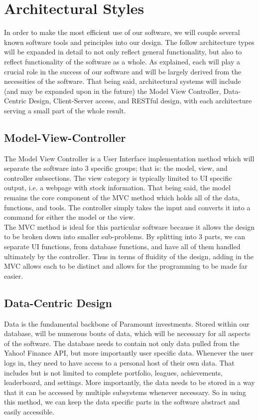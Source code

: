 \section{Architectural Styles}

In order to make the most efficient use of our software, we
will couple several known software tools and principles into
our design. The follow architecture types will be expanded in
detail to not only reflect general functionality, but also to
reflect functionality of the software as a whole. As explained,
each will play a crucial role in the success of our software and
will be largely derived from the necessities of the software.
That being said, architectural systems will include (and may be
expanded upon in the future) the Model View Controller,
Data-Centric Design, Client-Server access, and RESTful design,
with each architecture serving a small part of the whole result.

\subsection{Model-View-Controller}

The Model View Controller is a User Interface implementation method
which will separate the software into 3 specific groups; that is:
the model, view, and controller subsections. The view category is
typically limited to UI specific output, i.e. a webpage with stock
information. That being said, the model remains the core component
of the MVC method which holds all of the data, functions, and tools.
The controller simply takes the input and converts it into a command
for either the model or the view.\\

The MVC method is ideal for this particular software because it allows
the design to be broken down into smaller sub-problems. By splitting
into 3 parts, we can separate UI functions, from database functions,
and have all of them handled ultimately by the controller. Thus in
terms of fluidity of the design, adding in the MVC allows each to be
distinct and allows for the programming to be made far easier.

\subsection{Data-Centric Design}

Data is the fundamental backbone of Paramount investments.
Stored within our database, will be numerous bouts of data,
which will be necessary for all aspects of the software. The
database needs to contain not only data pulled from the Yahoo!
Finance API, but more importantly user specific data. Whenever
the user logs in, they need to have access to a personal host of
their own data. That includes but is not limited to complete
portfolio, leagues, achievements, leaderboard, and settings.
More importantly, the data needs to be stored in a way that it
can be accessed by multiple subsystems whenever necessary. So
in using this method, we can keep the data specific parts in the
software abstract and easily accessible.


